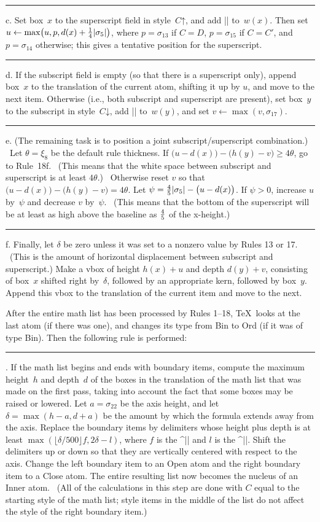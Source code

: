 \rule 18c. Set box~$x$ to the superscript field in style~$C\mathord\uparrow$,
and add |\scriptspace| to~$w(x)$. Then set $u\leftarrow\max\bigl(u,p,
d(x)+{1\over4}\vert\sigma_5\vert\bigr)$, where $p=\sigma_{13}$ if $C=D$,
$p=\sigma_{15}$ if $C=C'$, and $p=\sigma_{14}$ otherwise; this gives a
tentative position for the superscript.

\rule 18d. If the subscript field is empty (so that there is a
superscript only), append box~$x$ to the translation of the current atom,
shifting it up by $u$, and move to the next item. Otherwise (i.e.,
both subscript and superscript are present), set box~$y$ to the
subscript in style~$C\mathord\downarrow$, add |\scriptspace| to~$w(y)$,
and set $v\leftarrow\max(v,\sigma_{17})$.

\rule 18e. (The remaining task is to position a joint
subscript/superscript combination.) \ Let $\theta=\xi_8$ be the default
rule thickness.  If $\bigl(u-d(x)\bigr)-\bigl(h(y)-v\bigr)\ge4\theta$, go
to Rule~18f. \ (This means that the white space between subscript and
superscript is at least $4\theta$.) \ Otherwise reset $v$ so that
$\bigl(u-d(x)\bigr)-\bigl(h(y)-v\bigr)=4\theta$. Let $\psi={4\over5}
\vert\sigma_5\vert-\bigl(u-d(x)\bigr)$. If $\psi>0$, increase $u$
by~$\psi$ and decrease $v$ by~$\psi$. \ (This means that the bottom of the
superscript will be at least as high above the baseline as $4\over5$ of
the x-height.)

\rule 18f. Finally, let $\delta$ be zero unless it was set to a nonzero
value by Rules 13 or 17. \ (This is the amount of horizontal displacement
between subscript and superscript.) Make a vbox of height $h(x)+u$ and
depth $d(y)+v$, consisting of box~$x$ shifted right by~$\delta$, followed
by an appropriate kern, followed by box~$y$. Append this vbox to the
translation of the current item and move to the next.

\bigbreak\noindent
After the entire math list has been processed by Rules 1--18, \TeX\ looks
at the last atom (if there was one), and changes its type from
Bin to Ord (if it was of type Bin). Then the following rule is performed:

\rule 19. If the math list begins and ends with boundary items, compute
the maximum height~$h$ and depth~$d$ of the boxes in the translation of
the math list that was made on the first pass, taking into account the
fact that some boxes may be raised or lowered. Let $a=\sigma_{22}$ be the
axis height, and let $\delta=\max(h-a,d+a)$ be the amount by which the
formula extends away from the axis. Replace the boundary items by
delimiters whose height plus depth is at least $\max(\lfloor\delta/500\rfloor
f,2\delta-l)$, where $f$ is the ^|\delimiterfactor|
and $l$ is the ^|\delimitershortfall|.  Shift the delimiters up or down so
that they are vertically centered with respect to the axis. Change the left
boundary item to an Open atom and the right boundary item to
a Close atom. The entire resulting list now becomes the nucleus of an
Inner atom. \ (All of the calculations in this step are done with
$C$ equal to the starting style of the math list; style items in the
middle of the list do not affect the style of the right boundary item.)

